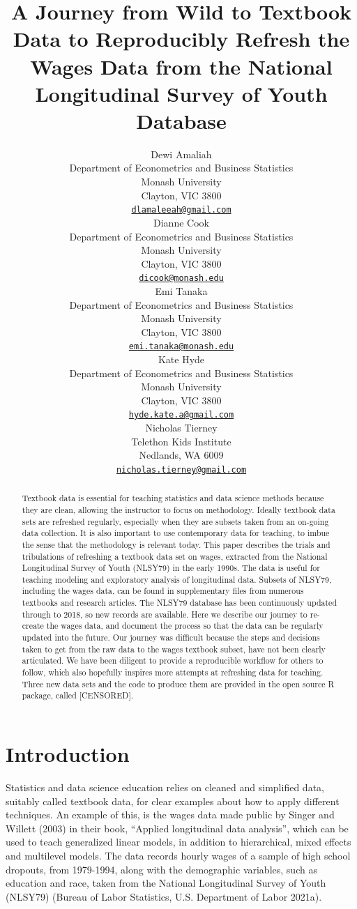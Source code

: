 \documentclass{article}
\title{A Journey from Wild to Textbook Data to Reproducibly Refresh the Wages Data from the National Longitudinal Survey of Youth Database}
\author{
    Dewi Amaliah
   \\
    Department of Econometrics and Business Statistics \\
    Monash University \\
  Clayton, VIC 3800 \\
  \texttt{\href{mailto:dlamaleeah@gmail.com}{\nolinkurl{dlamaleeah@gmail.com}}} \\
   \And
    Dianne Cook
   \\
    Department of Econometrics and Business Statistics \\
    Monash University \\
  Clayton, VIC 3800 \\
  \texttt{\href{mailto:dicook@monash.edu}{\nolinkurl{dicook@monash.edu}}} \\
   \And
    Emi Tanaka
   \\
    Department of Econometrics and Business Statistics \\
    Monash University \\
  Clayton, VIC 3800 \\
  \texttt{\href{mailto:emi.tanaka@monash.edu}{\nolinkurl{emi.tanaka@monash.edu}}} \\
   \And
    Kate Hyde
   \\
    Department of Econometrics and Business Statistics \\
    Monash University \\
  Clayton, VIC 3800 \\
  \texttt{\href{mailto:hyde.kate.a@gmail.com}{\nolinkurl{hyde.kate.a@gmail.com}}} \\
   \And
    Nicholas Tierney
   \\
    Telethon Kids Institute \\
  Nedlands, WA 6009 \\
  \texttt{\href{mailto:nicholas.tierney@gmail.com}{\nolinkurl{nicholas.tierney@gmail.com}}} \\
  }
\begin{document}
\maketitle


\begin{abstract}
Textbook data is essential for teaching statistics and data science methods because they are clean, allowing the instructor to focus on methodology. Ideally textbook data sets are refreshed regularly, especially when they are subsets taken from an on-going data collection. It is also important to use contemporary data for teaching, to imbue the sense that the methodology is relevant today. This paper describes the trials and tribulations of refreshing a textbook data set on wages, extracted from the National Longitudinal Survey of Youth (NLSY79) in the early 1990s. The data is useful for teaching modeling and exploratory analysis of longitudinal data. Subsets of NLSY79, including the wages data, can be found in supplementary files from numerous textbooks and research articles. The NLSY79 database has been continuously updated through to 2018, so new records are available. Here we describe our journey to re-create the wages data, and document the process so that the data can be regularly updated into the future. Our journey was difficult because the steps and decisions taken to get from the raw data to the wages textbook subset, have not been clearly articulated. We have been diligent to provide a reproducible workflow for others to follow, which also hopefully inspires more attempts at refreshing data for teaching. Three new data sets and the code to produce them are provided in the open source R package, called {[}CENSORED{]}.
\end{abstract}


\hypertarget{intro}{%
\section{Introduction}\label{intro}}

Statistics and data science education relies on cleaned and simplified data, suitably called textbook data, for clear examples about how to apply different techniques. An example of this, is the wages data made public by Singer and Willett (2003) in their book, ``Applied longitudinal data analysis'', which can be used to teach generalized linear models, in addition to hierarchical, mixed effects and multilevel models. The data records hourly wages of a sample of high school dropouts, from 1979-1994, along with the demographic variables, such as education and race, taken from the National Longitudinal Survey of Youth (NLSY79) (Bureau of Labor Statistics, U.S. Department of Labor 2021a).
\end{document}
